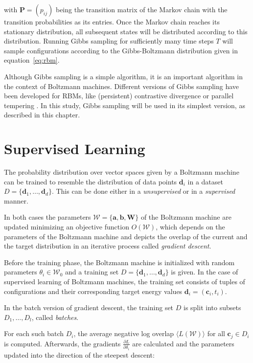 with $\bm{P} = (p_{ij})$ being the transition matrix of the Markov chain with the transition probabilities as its entries.
Once the Markov chain reaches its stationary distribution, all subsequent states will be distributed according to this distribution. Running Gibbs sampling for 
sufficiently many time steps $T$ will sample configurations according 
to the Gibbs-Boltzmann distribution given in equation~\ref{eq:rbm}.

Although Gibbs sampling is a simple algorithm, it is an important algorithm in the context of 
Boltzmann machines. Different versions of Gibbs sampling have been developed for RBMs, like 
(persistent) contrastive divergence \cite{hinton2002training, tieleman2008training} or parallel tempering \cite{desjardins2010parallel}. In this study,
Gibbs sampling will be used in its simplest version, as described in this chapter.
    
\section{Supervised Learning}
\label{sec:learning}
The probability distribution over vector spaces given by a Boltzmann machine can be trained to 
resemble the distribution of data points $\bm{d}_i$ in a dataset $D=\{\bm{d}_1,\dots,\bm{d}_d\}$. This can be done either in a \textit{unsupervised}
or in a \textit{supervised} manner.

In both cases the parameters $\mathcal{W} = \{\bm{a},\bm{b},\bm{W}\}$ of the Boltzmann machine are updated minimizing 
an objective function $O(\mathcal{W})$, which depends on the parameters of the Boltzmann machine and 
depicts the overlap of the current and the target distribution in an iterative process called \textit{gradient descent}.

Before the training phase, the Boltzmann machine is initialized with random parameters $\theta_i \in \mathcal{W}_0$ and a training set 
$D=\{\bm{d}_1,\dots,\bm{d}_d\}$ is given. In the case of supervised learning of Boltzmann machines, the training set consists of tuples of configurations and their corresponding target energy values $\bm{d}_i= (\bm{c}_i, t_i)$.

In the batch version of gradient descent, the training set $D$ is 
split into subsets $D_1, \dots, D_l$, called \textit{batches}.

For each such batch $D_i$, the average negative log overlap $\langle L(\mathcal{W})\rangle$ for all $\bm{c}_j \in D_i$
is computed. Afterwards, the gradients $\frac{\partial L}{\partial \delta_i}$ are calculated and the parameters updated into
the direction of the steepest descent:

